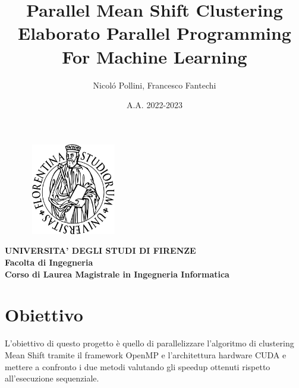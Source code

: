 \documentclass{article}
\title{\LARGE Parallel Mean Shift Clustering \\
\large Elaborato Parallel Programming For Machine Learning}
\author{Nicol\'o Pollini, Francesco Fantechi}
\date{A.A. 2022-2023}
\begin{document}
\maketitle

\begin{figure}[!h]
\centering
\includegraphics[width=4cm, height=4cm]{"Immagini/LogoUnifi.PNG"}
\end{figure}

\begin{center}
\textbf{\large UNIVERSITA' DEGLI STUDI DI FIRENZE \\
Facolta di Ingegneria \\
\normalsize Corso di Laurea Magistrale in Ingegneria Informatica}
\end{center}


\newpage

\tableofcontents

\newpage

\section{Obiettivo}

L'obiettivo di questo progetto è quello di parallelizzare l'algoritmo di clustering Mean Shift tramite il framework OpenMP e l'architettura hardware CUDA e mettere a confronto i due metodi valutando gli speedup ottenuti rispetto all'esecuzione sequenziale.  
\end{document}
